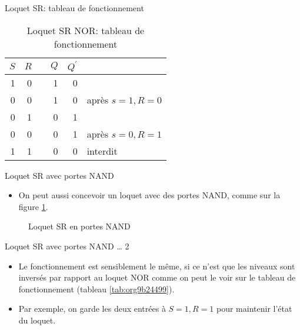 \documentclass[presentation]{beamer}
\begin{document}
\begin{frame}[label={sec:orgf667365}]{Loquet SR: tableau de fonctionnement}
\begin{table}[htbp]
\caption{\label{tab:orgd8813a6}Loquet SR NOR: tableau de fonctionnement}
\centering
\begin{tabular}{rrlrrl}
\(S\) & \(R\) &  & \(Q\) & \(Q^\prime\) & \\[0pt]
\hline
1 & 0 &  & 1 & 0 & \\[0pt]
0 & 0 &  & 1 & 0 & après \(s=1, R=0\)\\[0pt]
0 & 1 &  & 0 & 1 & \\[0pt]
0 & 0 &  & 0 & 1 & après \(s=0, R=1\)\\[0pt]
1 & 1 &  & 0 & 0 & interdit\\[0pt]
\end{tabular}
\end{table}
\end{frame}

\begin{frame}[label={sec:org2f255cd}]{Loquet SR avec portes NAND}
\begin{itemize}
\item On peut aussi concevoir un loquet avec des portes NAND, comme sur la figure \ref{fig:org5748055}.
\end{itemize}

\begin{figure}[htbp]
\centering

\caption{\label{fig:org5748055}Loquet SR en portes NAND}
\end{figure}
\end{frame}

\begin{frame}[label={sec:orgf1f8919}]{Loquet SR avec portes NAND \ldots{} 2}
\begin{itemize}
\item Le fonctionnement est sensiblement le même, si ce n'est que les niveaux sont inversés par rapport au loquet NOR comme on peut le voir sur le tableau de fonctionnement (tableau \ref{tab:org9b24499}).

\item Par exemple, on garde les deux entrées à \(S=1, R=1\) pour maintenir l'état du loquet.
\end{itemize}
\end{frame}
\end{document}
